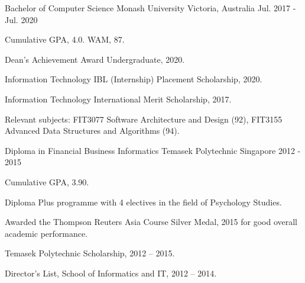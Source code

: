 \begin{cventries}
  \cventry
    {Bachelor of Computer Science}
    {Monash University}
    {Victoria, Australia}
    {Jul. 2017 - Jul. 2020}
    {
      \begin{cvitems}
        \item {Cumulative GPA, 4.0. WAM, 87.}
        \item {Dean's Achievement Award Undergraduate, 2020.}
        \item {Information Technology IBL (Internship) Placement Scholarship, 2020.}
        \item {Information Technology International Merit Scholarship, 2017.}
		\item {Relevant subjects: FIT3077 Software Architecture and Design (92), FIT3155 Advanced Data Structures and Algorithms (94).}
      \end{cvitems}
    }
    
    \cventry
    {Diploma in Financial Business Informatics}
    {Temasek Polytechnic}
    {Singapore}
    {2012 - 2015}
    {
      \begin{cvitems}
        \item {Cumulative GPA, 3.90.}
        \item {Diploma Plus programme with 4 electives in the field of Psychology Studies.}
        \item {Awarded the Thompson Reuters Asia Course Silver Medal, 2015 for good overall academic performance.}
        \item {Temasek Polytechnic Scholarship, 2012 – 2015.}
        \item {Director’s List, School of Informatics and IT, 2012 – 2014.}
      \end{cvitems}
    }
\end{cventries}
  
